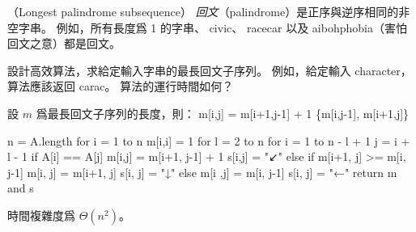 \startPROBLEM
（Longest palindrome subsequence）
\emph{回文}（palindrome）是正序與逆序相同的非空字串。
例如，所有長度爲 1 的字串、 civic、 racecar 以及 aibohphobia（害怕回文之意）都是回文。

設計高效算法，求給定輸入字串的最長回文子序列。
例如，給定輸入 character，算法應該返回 carac。
算法的運行時間如何？
\stopPROBLEM

\startANSWER
設 $m$ 爲最長回文子序列的長度，則：
\startformula
m[i,j] = \startcases
\NC m[i+1,j-1] + 1 \NC {} \NR
\NC \max\{m[i,j-1], m[i+1,j]\} \NC {} \NR
\stopcases
\stopformula

\startCLRSCODE
n = A.length
for i = 1 to n
	m[i,i] = 1
for l = 2 to n
	for i = 1 to n - l + 1
		j = i + l - 1
		if A[i] == A[j]
			m[i,j] = m[i+1, j-1] + 1
			s[i,j] = "↙"
		else if m[i+1, j] >= m[i, j-1]
			m[i, j] = m[i+1, j]
			s[i, j] = "↓"
		else
			m[i ,j] = m[i, j-1]
			s[i, j] = "←"
return m and s
\stopCLRSCODE

時間複雜度爲 $\Theta(n^2)$。
\stopANSWER
